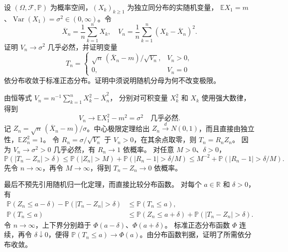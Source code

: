 \begin{optionalexercise}\label{b1:ex:30-estimated-variance}
设 \((\Omega,\mathcal F,\mathbb P)\) 为概率空间，\((X_k)_{k\geq1}\) 为独立同分布的实随机变量，
\(\mathbb EX_1=m\)、\(\operatorname{Var}(X_1)=\sigma^2\in(0,\infty)\)。令
\[
 \overline X_n=\frac1n\sum_{k=1}^nX_k,\quad
 V_n=\frac1n\sum_{k=1}^n(X_k-\overline X_n)^2.
\]
证明 \(V_n\to\sigma^2\) 几乎必然，并证明变量
\[
 T_n=\begin{cases}
 \sqrt n\,(\overline X_n-m)/\sqrt{V_n},&V_n>0,\\
 0,&V_n=0
 \end{cases}
\]
依分布收敛于标准正态分布。证明中须说明随机分母为何不改变极限。
\end{optionalexercise}
\begin{solution}
由恒等式
\(V_n=n^{-1}\sum_{k=1}^nX_k^2-\overline X_n^2\)，
分别对可积变量 \(X_k^2\) 和 \(X_k\) 使用强大数律，得到
\[
 V_n\longrightarrow\mathbb EX_1^2-m^2=\sigma^2\quad\text{几乎必然}.
\]
记 \(Z_n=\sqrt n\,(\overline X_n-m)/\sigma\)。中心极限定理给出
\(Z_n\xrightarrow{d}N(0,1)\)，而且直接由独立性，\(\mathbb EZ_n^2=1\)。
令 \(R_n=\sigma/\sqrt{V_n}\) 于 \(V_n>0\)，在其余点取零，则 \(T_n=R_nZ_n\)。
因为 \(V_n\to\sigma^2>0\) 几乎必然，有 \(R_n\to1\) 依概率。
对任意 \(M>0\)、\(\delta>0\)，
\[
 \mathbb P(|T_n-Z_n|>\delta)
 \leq\mathbb P(|Z_n|>M)+\mathbb P(|R_n-1|>\delta/M)
 \leq M^{-2}+\mathbb P(|R_n-1|>\delta/M).
\]
先令 \(n\to\infty\)，再令 \(M\to\infty\)，得到 \(T_n-Z_n\to0\) 依概率。

最后不预先引用随机归一化定理，而直接比较分布函数。
对每个 \(a\in\mathbb R\) 和 \(\delta>0\)，有
\[
 \begin{split}
 \mathbb P(Z_n\leq a-\delta)-\mathbb P(|T_n-Z_n|>\delta)
 &\leq\mathbb P(T_n\leq a),\\
 \mathbb P(T_n\leq a)
 &\leq\mathbb P(Z_n\leq a+\delta)+\mathbb P(|T_n-Z_n|>\delta).
 \end{split}
\]
令 \(n\to\infty\)，上下界分别趋于 \(\Phi(a-\delta)\)、\(\Phi(a+\delta)\)。
标准正态分布函数 \(\Phi\) 连续，再令 \(\delta\downarrow0\)，便得
\(\mathbb P(T_n\leq a)\to\Phi(a)\)。由分布函数判据，证明了所需依分布收敛。
\end{solution}
